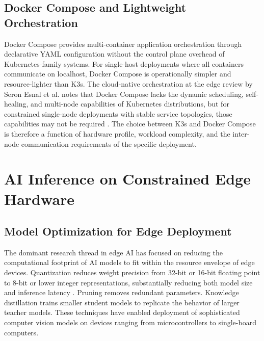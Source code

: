 \subsection{Docker Compose and Lightweight Orchestration}
\label{sec:docker_compose}
Docker Compose provides multi-container application orchestration through declarative YAML configuration without the control plane overhead of Kubernetes-family systems. For single-host deployments where all containers communicate on localhost, Docker Compose is operationally simpler and resource-lighter than K3s. The cloud-native orchestration at the edge review by Seron Esnal et al. notes that Docker Compose lacks the dynamic scheduling, self-healing, and multi-node capabilities of Kubernetes distributions, but for constrained single-node deployments with stable service topologies, those capabilities may not be required \cite{buinevich2023cloudnative}. The choice between K3s and Docker Compose is therefore a function of hardware profile, workload complexity, and the inter-node communication requirements of the specific deployment.

\section{AI Inference on Constrained Edge Hardware}
\label{sec:ai_infer}
\subsection{Model Optimization for Edge Deployment}
\label{sec:model_optimization}
The dominant research thread in edge AI has focused on reducing the computational footprint of AI models to fit within the resource envelope of edge devices. Quantization reduces weight precision from 32-bit or 16-bit floating point to 8-bit or lower integer representations, substantially reducing both model size and inference latency \cite{jacob2018quantization, 
wang2023ondevice}. Pruning removes redundant parameters. Knowledge distillation trains smaller student models to replicate the behavior of larger teacher models\cite{hinton2015distilling}. These techniques have enabled deployment of sophisticated computer vision models on devices ranging from microcontrollers to single-board computers\cite{deng2020compression}.

